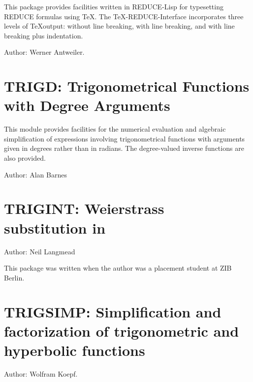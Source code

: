 This package provides facilities written in REDUCE-Lisp for typesetting
REDUCE formulas using \TeX.  The \TeX-REDUCE-Interface incorporates three
levels of \TeX output: without line breaking, with line breaking, and
with line breaking plus indentation.

Author: Werner Antweiler.

\newpage

\section{TRIGD: Trigonometrical Functions with Degree Arguments}

This module provides facilities for the numerical evaluation and
algebraic simplification of expressions involving trigonometrical
functions with arguments given in degrees rather than in radians. The
degree-valued inverse functions are also provided.

Author: Alan Barnes



\newpage

\section{TRIGINT: Weierstrass substitution in \REDUCE}

Author: Neil Langmead

This package was written when the author was a placement student at ZIB Berlin.



\iffalse
\newpage

\section{TRIGSIMP: Simplification and factorization of trigonometric
and hyperbolic functions}

\label{TRIGSIMP}

\iffalse
TRIGSIMP is a useful tool for all kinds of trigonometric and hyperbolic
simplification and factorization.  There are three procedures included in
TRIGSIMP: trigsimp, trigfactorize and triggcd.  The first is for finding
simplifications of trigonometric or hyperbolic expressions with many
options, the second for factorizing them and the third for finding the
greatest common divisor of two trigonometric or hyperbolic polynomials.
\fi
Author: Wolfram Koepf.

